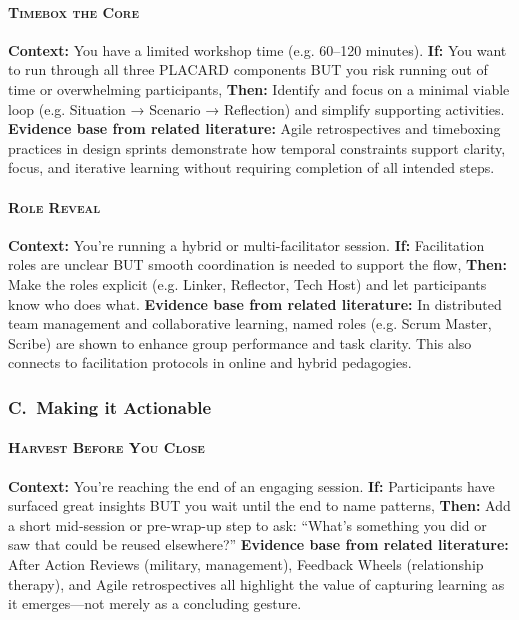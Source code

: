 \documentclass[acmlarge,timestamp]{acmart}
\begin{document}
{\paragraph*{{\scshape Timebox the Core}}

\noindent \textbf{Context:} You have a limited workshop time (e.g. 60–120 minutes).
\textbf{If:} You want to run through all three PLACARD components BUT you risk running out of time or overwhelming participants,
\textbf{Then:} Identify and focus on a minimal viable loop (e.g. Situation → Scenario → Reflection) and simplify supporting activities.
\textbf{Evidence base from related literature:} Agile retrospectives and timeboxing practices in design sprints demonstrate how temporal constraints support clarity, focus, and iterative learning without requiring completion of all intended steps.

\paragraph*{{\scshape Role Reveal}}

\noindent \textbf{Context:} You’re running a hybrid or multi-facilitator session.
\textbf{If:} Facilitation roles are unclear BUT smooth coordination is needed to support the flow,
\textbf{Then:} Make the roles explicit (e.g. Linker, Reflector, Tech Host) and let participants know who does what.
\textbf{Evidence base from related literature:} In distributed team management and collaborative learning, named roles (e.g. Scrum Master, Scribe) are shown to enhance group performance and task clarity. This also connects to facilitation protocols in online and hybrid pedagogies.

\subsubsection*{C.~Making it Actionable}

\paragraph*{{\scshape Harvest Before You Close}}

\noindent \textbf{Context:} You’re reaching the end of an engaging session.
\textbf{If:} Participants have surfaced great insights BUT you wait until the end to name patterns,
\textbf{Then:} Add a short mid-session or pre-wrap-up step to ask: “What’s something you did or saw that could be reused elsewhere?”
\textbf{Evidence base from related literature:} After Action Reviews (military, management), Feedback Wheels (relationship therapy), and Agile retrospectives all highlight the value of capturing learning as it emerges—not merely as a concluding gesture.

}
\end{document}
